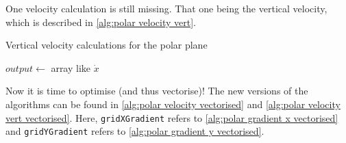 One velocity calculation is still missing. That one being the vertical velocity, which is described in \autoref{alg:polar velocity vert}.

\begin{algorithm}[htb]
    \caption{Vertical velocity calculations for the polar plane}
    \label{alg:polar velocity vert}
    $output \leftarrow$ array like $\dot{x}$ \;
\end{algorithm}

Now it is time to optimise (and thus vectorise)! The new versions of the algorithms can be found in \autoref{alg:polar velocity vectorised} and \autoref{alg:polar velocity vert vectorised}. 
Here, \texttt{gridXGradient} refers to \autoref{alg:polar gradient x vectorised} and \texttt{gridYGradient} refers to \autoref{alg:polar gradient y vectorised}.

